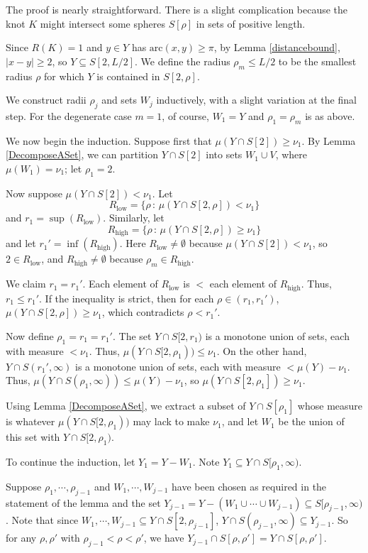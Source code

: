 \documentclass{elsart}
\begin{document}
\begin{pf} 
The proof is nearly straightforward.  There is a slight complication
because the knot $K$ might intersect some spheres $S[\rho]$ in sets
of positive length.

Since $R(K)=1$ and $y\in Y$ has $\mathrm{arc}(x,y)\geq \pi$, by
Lemma \ref{distancebound},
$|x-y| \geq 2$, so $Y\subseteq S[2,L/2]$.
We define the radius $\rho_m\leq L/2$ to be the smallest radius
$\rho$ for which $Y$ is contained in $S[2,\rho]$.  

We construct radii $\rho_j$ and sets $W_j$ inductively, with a slight
variation at the final step.  For the degenerate case $m=1$, of course,
$W_1=Y$ and $\rho_1=\rho_m$ is as above.

We now begin the induction.  Suppose first that 
$\mu(Y\cap S[2]) \geq \nu_1$.  By Lemma \ref{DecomposeASet}, 
we can partition $Y\cap S[2]$
into sets $W_1\cup V$, where $\mu(W_1)=\nu_1$; let $\rho_1=2$.

Now suppose $\mu(Y\cap S[2])< \nu_1$.  Let
$$R_{\text{low}}=\{\rho\,:\,\mu(Y\cap S[2,\rho])<\nu_1\}$$
and $r_1=\sup(R_{\text{low}})$.
Similarly, let
$$R_{\text{high}}=\{\rho\,:\,\mu(Y\cap S[2,\rho])\geq \nu_1\}$$
and let $r_1'=\inf(R_{\text{high}})$.
Here $R_{\text{low}}\not = \emptyset$ because $\mu(Y\cap S[2])< \nu_1$,
so $2\in R_{\text{low}}$, and
$R_{\text{high}}\not = \emptyset$ because $\rho_m\in R_{\text{high}}$.

We claim $r_1=r_1'$.  Each element of $R_{\text{low}}$ is $<$ each element
of $R_{\text{high}}$.  Thus, $r_1\leq r_1'$.  If the inequality is strict, then
for each $\rho\in(r_1,r_1')$, $\mu(Y\cap S[2,\rho])\geq \nu_1$,
which contradicts $\rho<r_1'$.

Now define $\rho_1=r_1=r_1'$.  The set $Y\cap S[2,r_1)$ is a 
monotone union of sets, each with measure $<\nu_1$.
Thus, $\mu(Y\cap S[2,\rho_1))\leq \nu_1$.  On the other hand,
$Y\cap S(r_1',\infty)$ is a monotone union of sets, each with measure
$< \mu(Y)-\nu_1$.  Thus, $\mu(Y\cap S(\rho_1,\infty))\leq
\mu(Y)-\nu_1$, so $\mu(Y\cap S[2,\rho_1])\geq \nu_1$.

Using Lemma \ref{DecomposeASet},
we extract a subset of $Y\cap S[\rho_1]$ whose
measure is whatever $\mu(Y\cap S[2,\rho_1))$ may lack to make
$\nu_1$, and let $W_1$ be the union of this set with $Y\cap S[2,\rho_1)$.

To continue the induction, let $Y_1=Y-W_1$. Note
$Y_1\subseteq Y\cap S[\rho_1,\infty)$.

Suppose $\rho_1, \cdots, \rho_{j-1}$ and $W_1, \cdots, W_{j-1}$ have
been chosen as required in the statement of the lemma and the set
$Y_{j-1}=Y-(W_1\cup \cdots \cup W_{j-1})\subseteq S[\rho_{j-1},\infty)$.
Note that since $W_1,\cdots, W_{j-1}\subseteq Y\cap S[2,\rho_{j-1}]$,
$Y\cap S(\rho_{j-1},\infty)\subseteq Y_{j-1}$.  So for any 
$\rho,\rho'$ with
$\rho_{j-1}<\rho<\rho'$, we have
$Y_{j-1}\cap S[\rho,\rho']=Y\cap S[\rho,\rho']$.


\end{pf}
\end{document}
